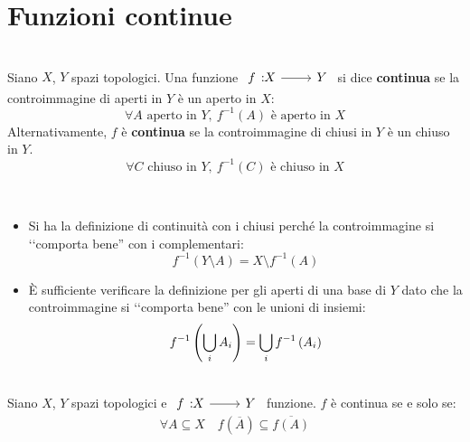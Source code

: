 \section{Funzioni continue}
\begin{define}~{}\\
Siano $X$, $Y$ spazi topologici. Una funzione $\funz{f}{X}{Y}$ si dice \textbf{continua} se la controimmagine di aperti in $Y$ è un aperto in $X$:
\begin{equation}
\forall A\text{ aperto in } Y,\ f^{-1}\left(A\right) \text{ è aperto in } X
\end{equation}
Alternativamente, $f$ è \textbf{continua} se la controimmagine di chiusi in $Y$ è un chiuso in $Y$.
\begin{equation}
	\forall C\text{ chiuso in } Y,\ f^{-1}\left(C\right) \text{ è chiuso in } X
\end{equation}
\vspace{-6mm}
\end{define}
\begin{observes}~{}
\begin{itemize}
\item Si ha la definizione di continuità con i chiusi perché la controimmagine si ‘‘comporta bene'' con i complementari:
\begin{equation*}
f^{-1}\left(Y\setminus A\right)=X\setminus f^{-1}\left(A\right)
\end{equation*}
\item È sufficiente verificare la definizione per gli aperti di una base di $Y$ dato che la controimmagine si ‘‘comporta bene'' con le unioni di insiemi:
\begin{equation*}
f^{-1}\left(\mathop{{\bigcup}}\displaylimits_{i}A_i\right)=\mathop{{\bigcup}}\displaylimits_{i}f^{-1}\left(A_i\right)
\end{equation*}
\end{itemize}
\vspace{-3mm}
\end{observes}
\begin{lemming}~{}\\
Siano $X$, $Y$ spazi topologici e $\funz{f}{X}{Y}$ funzione.
$f$ è continua se e solo se:
\begin{equation}
	\forall A\subseteq X\quad f\left(\overline{A}\right)\subseteq\overline{f\left(A\right)}
\end{equation}
\vspace{-6mm}
\end{lemming}
